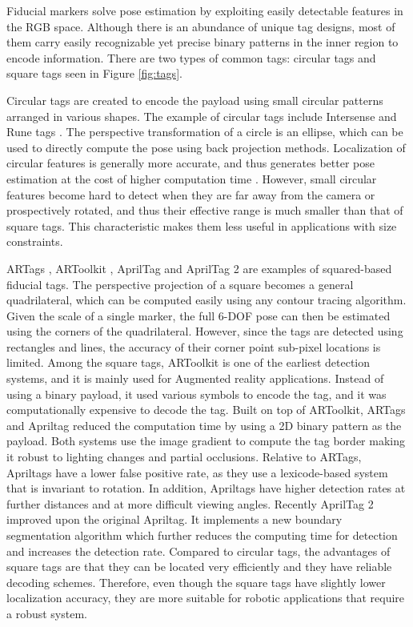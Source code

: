 	Fiducial markers solve pose estimation by exploiting easily detectable features in the RGB space. Although there is an abundance of unique tag designs, most of them carry easily recognizable yet precise binary patterns in the inner region to encode information. There are two types of common tags: circular tags and square tags seen in Figure \ref{fig:tags}. 
	
	Circular tags are created to encode the payload using small circular patterns arranged in various shapes. The example of circular tags include Intersense \citep{naimark2002circular} and Rune tags \citep{bergamasco2011rune}. The perspective transformation of a circle is an ellipse, which can be used to directly compute the pose using back projection methods. Localization of circular features is generally more accurate, and thus generates better pose estimation at the cost of higher computation time \citep{rice2006analysing}. However, small circular features become hard to detect when they are far away from the camera or prospectively rotated, and thus their effective range is much smaller than that of square tags. This characteristic makes them less useful in applications with size constraints. 
	
	ARTags \citep{fiala2004artag}, ARToolkit \citep{kato2002artoolkit}, AprilTag \citep{olson2011apriltag} and AprilTag 2 \citep{wang2016apriltag} are examples of squared-based fiducial tags. The perspective projection of a square becomes a general quadrilateral, which can be computed easily using any contour tracing algorithm. Given the scale of a single marker, the full 6-DOF pose can then be estimated using the corners of the quadrilateral. However, since the tags are detected using rectangles and lines, the accuracy of their corner point sub-pixel locations is limited. Among the square tags, ARToolkit is one of the earliest detection systems, and it is mainly used for Augmented reality applications. Instead of using a binary payload, it used various symbols to encode the tag, and it was computationally expensive to decode the tag. Built on top of ARToolkit, ARTags and Apriltag reduced the computation time by using a 2D binary pattern as the payload. Both systems use the image gradient to compute the tag border making it robust to lighting changes and partial occlusions. Relative to ARTags, Apriltags have a lower false positive rate, as they use a lexicode-based system that is invariant to rotation. In addition, Apriltags have higher detection rates at further distances and at more difficult viewing angles. Recently AprilTag 2 improved upon the original Apriltag. It implements a new boundary segmentation algorithm which further reduces the computing time for detection and increases the detection rate. Compared to circular tags, the advantages of square tags are that they can be located very efficiently and they have reliable decoding schemes. Therefore, even though the square tags have slightly lower localization accuracy, they are more suitable for robotic applications that require a robust system.